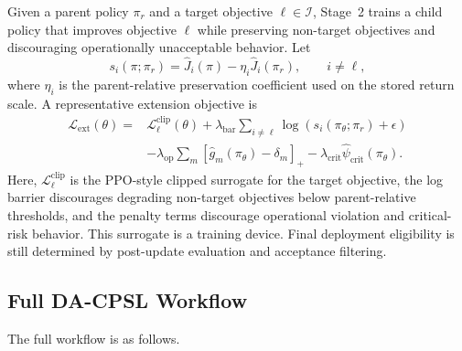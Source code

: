 \documentclass[sigconf,review,anonymous]{acmart}
\begin{document}
Given a parent policy \(\pi_r\) and a target objective
\(\ell\in\mathcal{I}\), Stage~2 trains a child policy that improves
objective \(\ell\) while preserving non-target objectives and discouraging
operationally unacceptable behavior. Let
\begin{equation}
 s_i(\pi;\pi_r)
 =
 \widehat{J}_i(\pi)-\eta_i\widehat{J}_i(\pi_r),
 \qquad i\neq \ell,
 \label{eq:app-preservation-slack}
\end{equation}
where \(\eta_i\) is the parent-relative preservation coefficient used on
the stored return scale. A representative extension objective is
\begin{equation}
\begin{aligned}
 \mathcal{L}_{\mathrm{ext}}(\theta)
 ={}&
 \mathcal{L}^{\mathrm{clip}}_{\ell}(\theta)
 +
 \lambda_{\mathrm{bar}}
 \sum_{i\neq\ell}
 \log\!\left(s_i(\pi_\theta;\pi_r)+\epsilon\right)
 \\
 &-
 \lambda_{\mathrm{op}}
 \sum_m
 \left[\widehat{g}_m(\pi_\theta)-\delta_m\right]_+
 -
 \lambda_{\mathrm{crit}}
 \widehat{\psi}_{\mathrm{crit}}(\pi_\theta).
\end{aligned}
\label{eq:app-extension-surrogate}
\end{equation}
Here, \(\mathcal{L}^{\mathrm{clip}}_{\ell}\) is the PPO-style clipped
surrogate for the target objective, the log barrier discourages degrading
non-target objectives below parent-relative thresholds, and the penalty
terms discourage operational violation and critical-risk behavior. This
surrogate is a training device. Final deployment eligibility is still
determined by post-update evaluation and acceptance filtering.

\subsection{Full DA-CPSL Workflow}
\label{app:full-workflow}

The full workflow is as follows.
\end{document}
